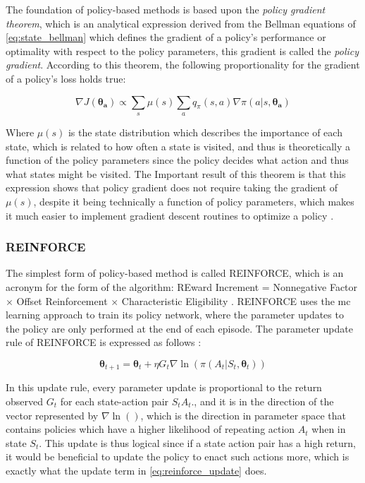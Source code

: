 \documentclass[../report.tex]{subfiles}
\begin{document}
The foundation of policy-based methods is based upon the \textit{policy gradient theorem}, which is an analytical expression derived from the Bellman equations of \autoref{eq:state_bellman} which defines the gradient of a policy's performance or optimality with respect to the policy parameters, this gradient is called the \textit{policy gradient}. According to this theorem, the following proportionality for the gradient of a policy's loss holds true:

\begin{equation}
    \nabla J(\boldsymbol{\theta_a}) \propto \sum\limits_s \mu(s) \sum\limits_a q_{\pi}(s,a)\nabla \pi(a|s,\boldsymbol{\theta_a})
\end{equation}

Where $\mu(s)$ is the state distribution which describes the importance of each state, which is related to how often a state is visited, and thus is theoretically a function of the policy parameters since the policy decides what action and thus what states might be visited. The Important result of this theorem is that this expression shows that policy gradient does not require taking the gradient of $\mu(s)$, despite it being technically a function of policy parameters, which makes it much easier to implement gradient descent routines to optimize a policy \cite{intro_rl}.

\subsubsection{REINFORCE}

The simplest form of policy-based method is called REINFORCE, which is an acronym for the form of the algorithm: REward Increment = Nonnegative Factor $\times$ Offset Reinforcement $\times$ Characteristic Eligibility \cite{williams1992simple}. REINFORCE uses the \ac{mc} learning approach to train its policy network, where the parameter updates to the policy are only performed at the end of each episode. The parameter update rule of REINFORCE is expressed as follows \cite{intro_rl}:

{\myfont
\begin{equation}\label{eq:reinforce_update}
    \boldsymbol{\theta}_{t+1} = \boldsymbol{\theta}_t + \eta G_t \nabla \ln(\pi(A_t|S_t, \boldsymbol{\theta}_t))
\end{equation}
}

In this update rule, every parameter update is proportional to the return observed $G_t$ for each state-action pair $S_t A_t$., and it is in the direction of the vector represented by {\myfont$\nabla \ln()$}, which is the direction in parameter space that contains policies which have a higher likelihood of repeating action $A_t$ when in state $S_t$. This update is thus logical since if a state action pair has a high return, it would be beneficial to update the policy to enact such actions more, which is exactly what the update term in \autoref{eq:reinforce_update} does. 
\end{document}
